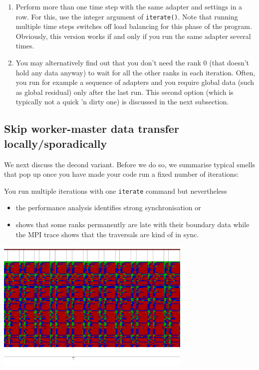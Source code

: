 \begin{enumerate}
  \item Perform more than one time step with the same adapter and settings in a
  row. For this, use the integer argument of \texttt{iterate()}. Note that
  running multiple time steps switches off load balancing for this phase of the program.
  Obviously, this version works if and only if you run the same adapter several 
  times.
  \item You may alternatively find out that you don't need the rank 0 (that
  doesn't hold any data anyway) to wait for all the other ranks in each
  iteration. Often, you run for example a sequence of adapters and you require
  global data (such as global residual) only after the last run. 
  This second option (which is typically not a quick 'n dirty one) is discussed
  in the next subsection. 
\end{enumerate}



\subsection{Skip worker-master data transfer locally/sporadically}

We next discuss the decond variant.
Before we do so, we summarise typical smells that pop up once you have made 
your code run a fixed number of iterations:

\begin{smell}
You run multiple iterations with one \texttt{iterate} command but nevertheless
 \begin{itemize}
  \item the performance analysis identifies strong synchronisation or
  \item shows that some ranks permanently are late with their boundary data
  while the MPI trace shows that the traversals are kind of in sync.
 \end{itemize}
\end{smell}

\begin{center}
  \includegraphics[width=0.7\textwidth]{63_mpi-synchronisation/no-skip-of-reduction.png}
\end{center}

